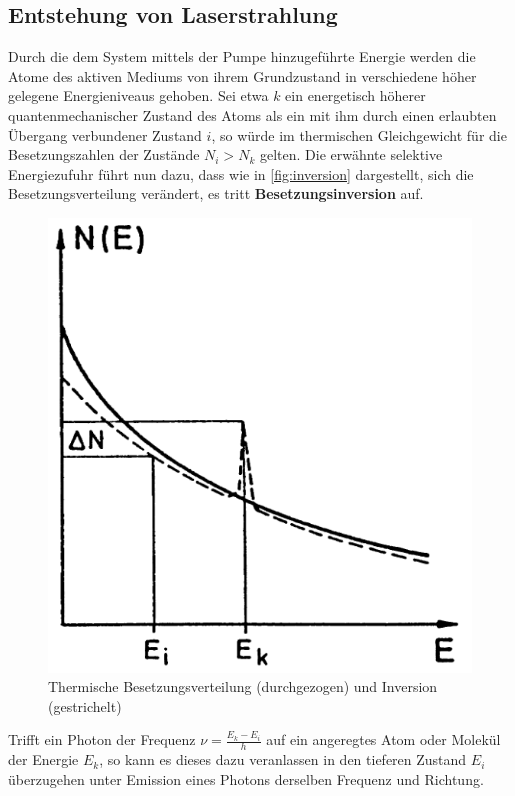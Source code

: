 \subsection{Entstehung von Laserstrahlung}\label{subsec:entstehung}
Durch die dem System mittels der Pumpe hinzugeführte Energie werden die Atome des aktiven Mediums von ihrem Grundzustand in verschiedene höher gelegene Energieniveaus gehoben.
Sei etwa $k$ ein energetisch höherer quantenmechanischer Zustand des Atoms als ein mit ihm durch einen erlaubten Übergang verbundener Zustand $i$, so würde im thermischen Gleichgewicht für die Besetzungszahlen der Zustände $N_i>N_k$ gelten. Die erwähnte selektive Energiezufuhr führt nun dazu, dass wie in \autoref{fig:inversion} dargestellt, sich die Besetzungsverteilung verändert, es tritt \textbf{Besetzungsinversion} auf.
\begin{figure}[H]
    \centering
    \includegraphics[scale=0.5]{Ressourcen/inversion.png}
    \caption{Thermische Besetzungsverteilung (durchgezogen) und Inversion (gestrichelt)\cite{Demtroeder}}\label{fig:inversion}
\end{figure}
Trifft ein Photon der Frequenz $\nu = \frac{E_k-E_i}{h}$ auf ein angeregtes Atom oder Molekül der Energie $E_k$, so kann es dieses dazu veranlassen in den tieferen Zustand $E_i$ überzugehen unter Emission eines Photons derselben Frequenz und Richtung.
